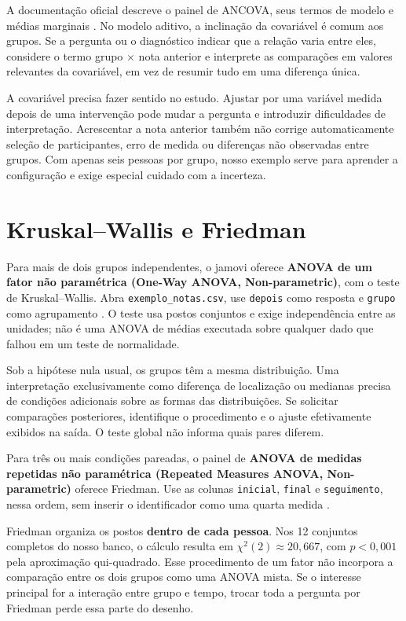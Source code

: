 A documentação oficial descreve o painel de ANCOVA, seus termos de modelo e médias marginais \parencite{JamoviAncova}. No modelo aditivo, a inclinação da covariável é comum aos grupos. Se a pergunta ou o diagnóstico indicar que a relação varia entre eles, considere o termo grupo $\times$ nota anterior e interprete as comparações em valores relevantes da covariável, em vez de resumir tudo em uma diferença única.

A covariável precisa fazer sentido no estudo. Ajustar por uma variável medida depois de uma intervenção pode mudar a pergunta e introduzir dificuldades de interpretação. Acrescentar a nota anterior também não corrige automaticamente seleção de participantes, erro de medida ou diferenças não observadas entre grupos. Com apenas seis pessoas por grupo, nosso exemplo serve para aprender a configuração e exige especial cuidado com a incerteza.

\section{Kruskal--Wallis e Friedman}

Para mais de dois grupos independentes, o jamovi oferece \textbf{ANOVA de um fator não paramétrica (One-Way ANOVA, Non-parametric)}, com o teste de Kruskal--Wallis. Abra \texttt{exemplo\_notas.csv}, use \texttt{depois} como resposta e \texttt{grupo} como agrupamento \parencite{JamoviKruskal}. O teste usa postos conjuntos e exige independência entre as unidades; não é uma ANOVA de médias executada sobre qualquer dado que falhou em um teste de normalidade.

Sob a hipótese nula usual, os grupos têm a mesma distribuição. Uma interpretação exclusivamente como diferença de localização ou medianas precisa de condições adicionais sobre as formas das distribuições. Se solicitar comparações posteriores, identifique o procedimento e o ajuste efetivamente exibidos na saída. O teste global não informa quais pares diferem.

Para três ou mais condições pareadas, o painel de \textbf{ANOVA de medidas repetidas não paramétrica (Repeated Measures ANOVA, Non-parametric)} oferece Friedman. Use as colunas \texttt{inicial}, \texttt{final} e \texttt{seguimento}, nessa ordem, sem inserir o identificador como uma quarta medida \parencite{JamoviFriedman}.

Friedman organiza os postos \textbf{dentro de cada pessoa}. Nos 12 conjuntos completos do nosso banco, o cálculo resulta em $\chi^2(2)\approx20{,}667$, com $p<0{,}001$ pela aproximação qui-quadrado. Esse procedimento de um fator não incorpora a comparação entre os dois grupos como uma ANOVA mista. Se o interesse principal for a interação entre grupo e tempo, trocar toda a pergunta por Friedman perde essa parte do desenho.

